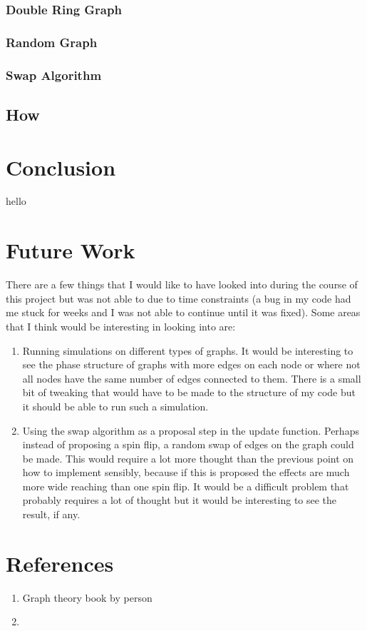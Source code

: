 \documentclass[pdftex,12pt,a4paper]{article}
\begin{document}

\subsubsection{Double Ring Graph}


\subsubsection{Random Graph}


\subsubsection{Swap Algorithm}

\subsection{How}

\newpage

\section{Conclusion}

hello

\newpage

\section{Future Work}

There are a few things that I would like to have looked into during the course of this project but was not able to due to time constraints (a bug in my code had me stuck for weeks and I was not able to continue until it was fixed). Some areas that I think would be interesting in looking into are:
\begin{enumerate}
\item Running simulations on different types of graphs. It would be interesting to see the phase structure of graphs with more edges on each node or where not all nodes have the same number of edges connected to them. There is a small bit of tweaking that would have to be made to the structure of my code but it should be able to run such a simulation.
\item Using the swap algorithm as a proposal step in the update function. Perhaps instead of proposing a spin flip, a random swap of edges on the graph could be made. This would require a lot more thought than the previous point on how to implement sensibly, because if this is proposed the effects are much more wide reaching than one spin flip. It would be a difficult problem that probably requires a lot of thought but it would be interesting to see the result, if any.
\end{enumerate}

\newpage
\section{References}

\begin{enumerate}
\item Graph theory book by person
\item
\end{enumerate}
\end{document}
